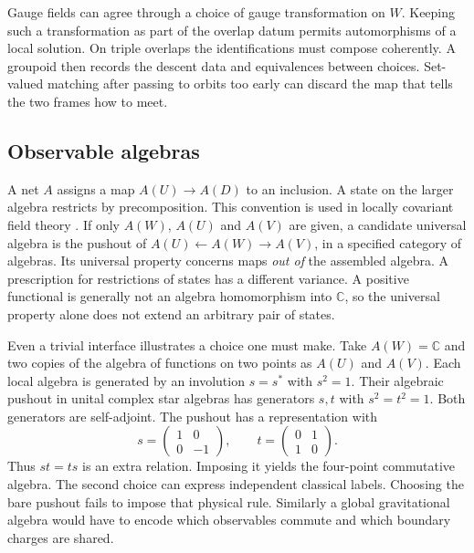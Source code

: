 \documentclass[11pt,letterpaper]{article}
\newcommand{\CC}{\mathbb C}
\begin{document}
Gauge fields can agree through a choice of gauge transformation on \(W\).
Keeping such a transformation as part of the overlap datum permits
automorphisms of a local solution. On triple overlaps the identifications
must compose coherently. A groupoid then records the descent data and
equivalences between choices. Set-valued matching after passing to orbits
too early can discard the map that tells the two frames how to meet.

\subsection{Observable algebras}
A net \(A\) assigns a map \(A(U)\to A(D)\) to an inclusion. A state on the
larger algebra restricts by precomposition. This convention is used in
locally covariant field theory \cite{bfv}. If only \(A(W)\), \(A(U)\) and
\(A(V)\) are given, a candidate universal algebra is the pushout of
\(A(U)\leftarrow A(W)\to A(V)\), in a specified category of algebras.
Its universal property concerns maps \emph{out of} the assembled algebra.
A prescription for restrictions of states has a different variance.
A positive functional is generally not an algebra homomorphism into
\(\CC\), so the universal property alone does not extend an arbitrary pair
of states.

Even a trivial interface illustrates a choice one must make. Take
\(A(W)=\CC\) and two copies of the algebra of functions on two points as
\(A(U)\) and \(A(V)\). Each local algebra is generated by an involution
\(s=s^*\) with \(s^2=1\). Their algebraic pushout in unital complex
star algebras has generators \(s,t\) with \(s^2=t^2=1\). Both
generators are self-adjoint. The pushout has a representation with
\[
 s=\begin{pmatrix}1&0\\0&-1\end{pmatrix},\qquad
 t=\begin{pmatrix}0&1\\1&0\end{pmatrix}.
\]
Thus \(st=ts\) is an extra relation. Imposing it yields the four-point
commutative algebra. The second choice can express independent classical
labels. Choosing the bare pushout fails to impose that physical rule.
Similarly a global gravitational algebra would have to encode which
observables commute and which boundary charges are shared.
\end{document}
